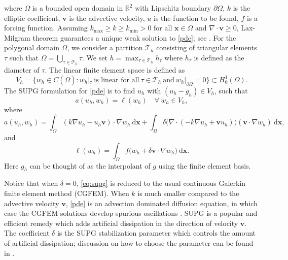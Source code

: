 \documentclass[times]{nlaauth}
\numberwithin{equation}{section}
\begin{document}
\noindent
where $\Omega$ is a bounded open domain in $\mathbb{R}^2$ with Lipschitz boundary $\partial\Omega$,  $k$ is the elliptic coefficient, $\boldsymbol{v}$ is the advective velocity, $u$ is the function to be found, $f$ is a forcing function. Assuming $k_{\max} \geq k \geq k_{\min} >0$ for all $\boldsymbol{x} \in\Omega$ and $\nabla \cdot \boldsymbol{v} \geq 0$,  Lax-Milgram theorem guarantees a unique weak solution to \eqref{pde}; see \cite{hundsdorfer2003numerical}.  For the polygonal domain $\Omega$, we consider a partition $\mathcal{T}_h$ consisting of triangular elements $\tau$ such that $\overline\Omega = \bigcup_{\tau\in\mathcal{T}_h} \tau.$ We set $h=\max_{\tau\in\mathcal{T}_h} h_\tau$ where $h_\tau$ is defined as the diameter of $\tau$. The linear finite element space is defined as
$$
V_h = \{w_h\in C(\overline\Omega): w_h|_\tau \ \text{is linear for all} \ \tau\in\mathcal{T}_h \ \text{and} \ w_h|_{\partial\Omega} = 0 \} \subset H^1_0(\Omega).
$$
The SUPG formulation for \eqref{pde} is to find $u_h$ with $(u_h - g_h) \in V_h$, such that
\begin{equation} \label{eq:supg}
a(u_h, w_h) = \ell(w_h) \quad \forall \ w_h \in V_h, 
\end{equation}
where 
\begin{equation*}
a(u_h, w_h) = \int_\Omega ( k \nabla u_h - u_h  \boldsymbol{v} ) \cdot \nabla w_h \ \text{d} \boldsymbol{x} + \int_\Omega \delta  \big(  \nabla \cdot ( -k\nabla u_h + \boldsymbol{v} u_h ) \big)  ( \boldsymbol{v}  \cdot \nabla w_h)  \ \text{d} \boldsymbol{x},
\end{equation*}
and
\begin{equation*}
\ell(w_h) = \int_\Omega f \big(  w_h + \delta \boldsymbol{v}  \cdot \nabla w_h \big)  \ \text{d} \boldsymbol{x}.
\end{equation*}
Here $g_h$ can be thought of as the interpolant of $g$ using the finite element basis.

Notice that when $\delta = 0$, \eqref{eq:supg} is reduced to the usual continuous Galerkin finite element method (CGFEM). When $k$ is much smaller compared to the advective velocity $\boldsymbol{v}$, \eqref{pde} is an advection dominated diffusion equation, in which case the CGFEM solutions develop spurious oscillations \cite{johnson2009numerical}.  SUPG is a popular and efficient remedy which adds artificial dissipation in the direction of velocity $\boldsymbol{v}$.  The coefficient $\delta$ is the SUPG stabilization parameter which controls the amount of artificial dissipation; discussion on how to choose the parameter can be found in \cite{brooks1982streamline, tezduyar2000finite, tezduyar2003stabilization}.
\end{document}
